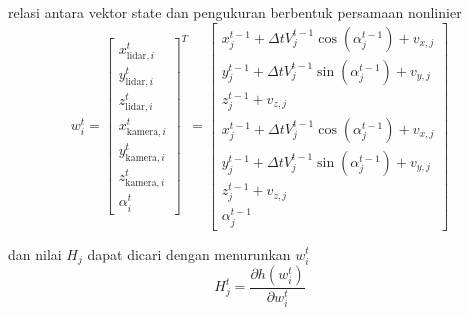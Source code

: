 \begin{frame}[allowframebreaks]
    relasi antara vektor state dan pengukuran berbentuk persamaan nonlinier
    \begin{equation}
        w_{i}^{t}=\left[\begin{array}{c}
            x_{\text{lidar}, i}^{t}\\
            y_{\text{lidar}, i}^{t}\\
            z_{\text{lidar}, i}^{t}\\
            x_{\text{kamera}, i}^{t}\\
            y_{\text{kamera}, i}^{t}\\
            z_{\text{kamera}, i}^{t}\\
            \alpha_{i}^{t}
        \end{array}\right]^{T}=\left[\begin{array}{c}
        x_{j}^{t-1}+\Delta t V_{j}^{t-1} \cos \left(\alpha_{j}^{t-1}\right) +v_{x,j}\\
        y_{j}^{t-1}+\Delta t V_{j}^{t-1} \sin \left(\alpha_{j}^{t-1}\right)+v_{y,j}\\
        z_{j}^{t-1}+v_{z,j}\\
        x_{j}^{t-1}+\Delta t V_{j}^{t-1} \cos \left(\alpha_{j}^{t-1}\right)+v_{x,j}\\
        y_{j}^{t-1}+\Delta t V_{j}^{t-1} \sin \left(\alpha_{j}^{t-1}\right)+v_{y,j}\\
        z_{j}^{t-1}+v_{z,j}\\
        \alpha_{j}^{t-1}
        \end{array}\right]
    \end{equation} 

    dan nilai $H_j$ dapat dicari dengan menurunkan $w_{i}^{t}$
    \begin{equation}
        H_{j}^{t}=\frac{\partial h\left(w_{i}^{t}\right)}{\partial w_{i}^{t}}
    \end{equation}
\end{frame}



